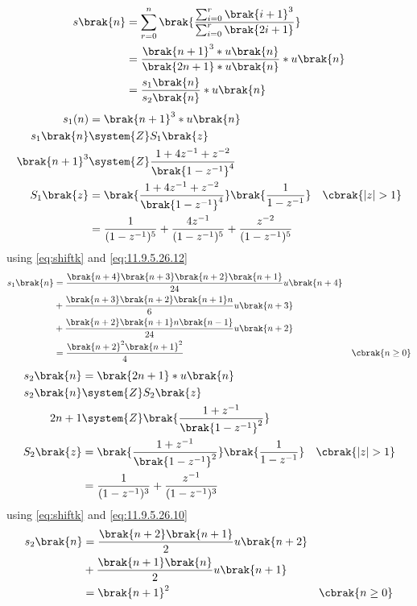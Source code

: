 \documentclass[journal,12pt,twocolumn]{article}
\begin{document}
\begin{align}
    s\brak{n} & = \sum_{r=0}^{n}\brak{\frac{\sum_{i=0}^{r} \brak{i+1}^{3}}{\sum_{i=0}^{r} \brak{2i+1}}} \\
    & = \frac{\brak{n+1}^3 * u\brak{n}}{\brak{2n+1} * u\brak{n}} * u\brak{n} \\
    & = \frac{s_1\brak{n}}{s_2\brak{n}} * u\brak{n}\label{9.5.25.1}
\end{align}
\begin{align}
    s_1(n) & = \brak{n+1}^{3} * u\brak{n}\\
    s_1\brak{n} & \system{Z} S_1\brak{z}\\
    \brak{n+1}^3 & \system{Z} \frac{1 + 4z^{-1} + z^{-2}}{\brak{1-z^{-1}}^4}\\ 
    S_1\brak{z} & = \brak{\frac{1 + 4z^{-1} + z^{-2}}{\brak{1-z^{-1}}^4}} \brak{\frac{1}{1-z^{-1}}} & \cbrak{|z| > 1}\\
    & = \frac{1}{(1 - z^{-1})^5} + \frac{4 z^{-1}}{(1 - z^{-1})^5} + \frac{z^{-2}}{(1 - z^{-1})^5}
\end{align}
using \eqref{eq:shiftk} and \eqref{eq:11.9.5.26.12}
\begin{align}
    s_1\brak{n} & = \frac{\brak{n + 4} \brak{n + 3} \brak{n + 2} \brak{n + 1}}{24}u\brak{n+4}\notag\\
    & + \frac{\brak{n + 3} \brak{n + 2} \brak{n + 1} n}{6}u\brak{n+3}\notag\\
    & + \frac{\brak{n + 2} \brak{n + 1} n \brak{n - 1}}{24}u\brak{n+2}\\
    & = \frac{\brak{n+2}^2\brak{n+1}^2}{4} & \cbrak{n\geq0}\label{9.5.25.2}
\end{align}
\begin{align}
    s_2\brak{n} & = \brak{2n+1} * u\brak{n}\\
    s_2\brak{n} & \system{Z} S_2\brak{z}\\
    2n+1 & \system{Z} \brak{\frac{1 + z^{-1}}{\brak{1-z^{-1}}^2}}\\  
    S_2\brak{z} & = \brak{\frac{1 + z^{-1}}{\brak{1-z^{-1}}^2}} \brak{\frac{1}{1-z^{-1}}} & \cbrak{|z| > 1}\\
    & = \frac{1}{(1 - z^{-1})^3} + \frac{z^{-1}}{(1 - z^{-1})^3}
\end{align}
using \eqref{eq:shiftk} and \eqref{eq:11.9.5.26.10}
\begin{align}
    s_2\brak{n} & = \frac{\brak{n + 2} \brak{n + 1}}{2}u\brak{n+2}\notag\\
    & + \frac{\brak{n + 1} \brak{n} }{2}u\brak{n+1}\\
    & = \brak{n+1}^2 & \cbrak{n\geq0} \label{9.5.25.3}
\end{align}
\end{document}
